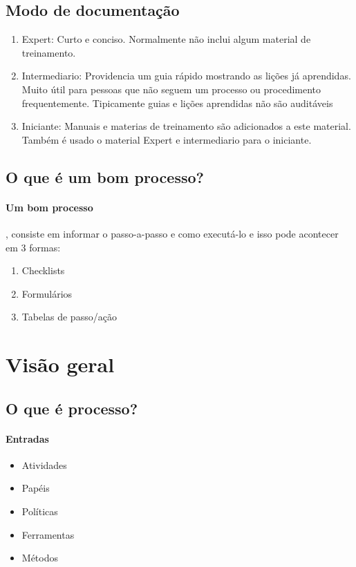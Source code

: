 \documentclass{article}
\begin{document}
\subsection{Modo de documentação}
\begin{enumerate}
	\item Expert: Curto e conciso. Normalmente não inclui algum material de treinamento.
	\item Intermediario: Providencia um guia rápido mostrando as lições já aprendidas. Muito útil para pessoas que não seguem um processo ou procedimento frequentemente. Tipicamente guias e lições aprendidas não são auditáveis
	\item Iniciante: Manuais e materias de treinamento são adicionados a este material. Também é usado o material Expert e intermediario para o iniciante. 
\end{enumerate}

\subsection{O que é um bom processo?}
\paragraph{Um bom processo}, consiste em informar o passo-a-passo e como executá-lo e isso pode acontecer em 3 formas:

\begin{enumerate}
	\item Checklists
		
	\item Formulários
	\item Tabelas de passo/ação
\end{enumerate}


\section{Visão geral}
\subsection{O que é processo?}
	\paragraph{Entradas}	
	
	\begin{itemize}
	\item Atividades
	\item Papéis
	\item Políticas
	\item Ferramentas
	\item Métodos
	\end{itemize}
\end{document}
